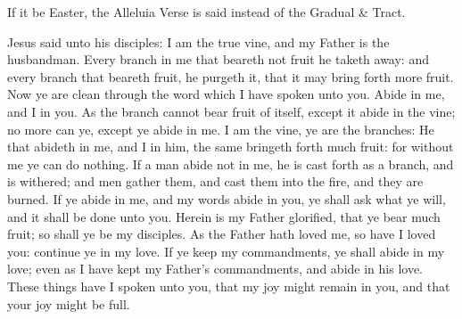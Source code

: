 
\begin{rubric}
    If it be Easter, the Alleluia Verse is said instead of the Gradual \& Tract.
\end{rubric}


 Jesus said unto his disciples: I am the true vine, and my Father is the husbandman. Every branch in me that beareth not fruit he taketh away: and every branch that beareth fruit, he purgeth it, that it may bring forth more fruit. Now ye are clean through the word which I have spoken unto you. Abide in me, and I in you. As the branch cannot bear fruit of itself, except it abide in the vine; no more can ye, except ye abide in me. I am the vine, ye are the branches: He that abideth in me, and I in him, the same bringeth forth much fruit: for without me ye can do nothing. If a man abide not in me, he is cast forth as a branch, and is withered; and men gather them, and cast them into the fire, and they are burned. If ye abide in me, and my words abide in you, ye shall ask what ye will, and it shall be done unto you. Herein is my Father glorified, that ye bear much fruit; so shall ye be my disciples. As the Father hath loved me, so have I loved you: continue ye in my love. If ye keep my commandments, ye shall abide in my love; even as I have kept my Father's commandments, and abide in his love. These things have I spoken unto you, that my joy might remain in you, and that your joy might be full.

